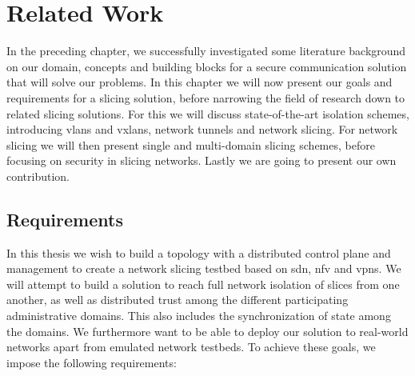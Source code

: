 \chapter{Related Work}
\label{related_work}




In the preceding chapter, we successfully investigated some literature background on our domain, concepts and building blocks for a secure communication solution that will solve our problems. In this chapter we will now present our goals and requirements for a slicing solution, before narrowing the field of research down to related slicing solutions. For this we will discuss state-of-the-art isolation schemes, introducing \acrshort{vlan}s and \acrshort{vxlan}s, network tunnels and network slicing. For network slicing we will then present single and multi-domain slicing schemes, before focusing on security in slicing networks. Lastly we are going to present our own contribution.

\section{Requirements}
\label{related_work_requirements}
In this thesis we wish to build a topology with a distributed control plane and management to create a network slicing testbed based on \acrshort{sdn}, \acrshort{nfv} and \acrshort{vpn}s. We will attempt to build a solution to reach full network isolation of slices from one another, as well as distributed trust among the different participating administrative domains. This also includes the synchronization of state among the domains. We furthermore want to be able to deploy our solution to real-world networks apart from emulated network testbeds.
To achieve these goals, we impose the following requirements:

